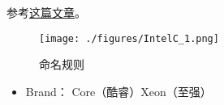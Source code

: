 
\begin{issues}
\issueDraft
\end{issues}

参考\href{https://www.itechtics.com/processor-generations/}{这篇文章}。

\begin{figure}[ht]
\centering
\texttt{[image: ./figures/IntelC\_1.png]}
\caption{命名规则} \label{IntelC_fig1}
\end{figure}

\begin{itemize}
\item Brand： Core（酷睿）Xeon（至强）
\end{itemize}
